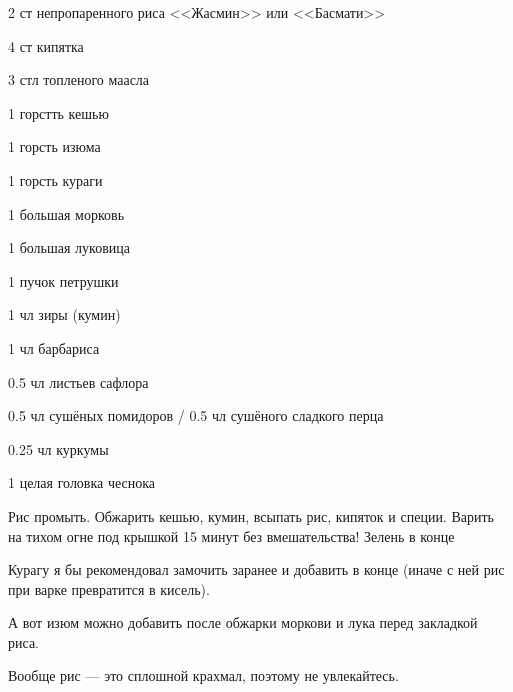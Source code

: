 {
\item 2 ст непропаренного риса <<Жасмин>> или <<Басмати>>
\item 4 ст кипятка
\item 3 стл топленого маасла
\item 1 горстть кешью
\item 1 горсть изюма 
\item 1 горсть кураги
\item 1 большая морковь
\item 1 большая луковица
\item 1 пучок петрушки 
}{
\item 1 чл зиры (кумин)
\item 1 чл барбариса
\item 0.5 чл листьев сафлора
\item 0.5 чл сушёных помидоров / 0.5 чл сушёного сладкого перца
\item 0.25 чл куркумы
\item 1 целая головка чеснока
}{
Рис промыть. Обжарить кешью, кумин, всыпать рис, кипяток и специи. Варить на тихом огне под крышкой 15 минут без вмешательства! Зелень в конце
}{
\begin{advice}
\item Курагу я бы рекомендовал замочить заранее и добавить в конце (иначе с ней рис при варке превратится в кисель). 
\item А вот изюм можно добавить после обжарки моркови и лука перед закладкой риса. 
\item Вообще рис — это сплошной крахмал, поэтому не увлекайтесь.
\end{advice}
}{}



